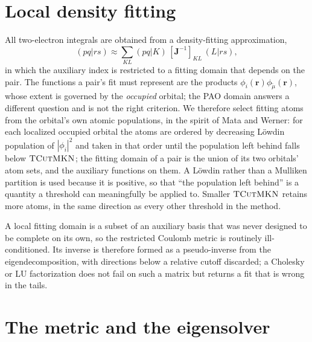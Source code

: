 \documentclass[aip,jcp,amsmath,amssymb,preprint,superscriptaddress]{revtex4-2}%
\newcommand{\pao}[1]{\tilde{#1}}
\newcommand{\TCut}[1]{\textsc{TCut#1}}
\begin{document}
\section{Local density fitting}
\label{sec:fitting}

All two-electron integrals are obtained from a density-fitting
approximation,\cite{Whitten1973,Vahtras1993}
%
\begin{equation}
  (pq|rs) \approx \sum_{KL} (pq|K)\,[\mathbf{J}^{-1}]_{KL}\,(L|rs),
\end{equation}
%
in which the auxiliary index is restricted to a fitting domain that depends
on the pair. The functions a pair's fit must represent are the products
$\phi_i(\mathbf{r})\phi_{\pao{\mu}}(\mathbf{r})$, whose extent is governed by
the \emph{occupied} orbital; the PAO domain answers a different question and is
not the right criterion. We therefore select fitting atoms from the orbital's
own atomic populations, in the spirit of Mata and
Werner:\cite{MataWerner2006} for each localized occupied orbital the atoms are
ordered by decreasing L\"owdin population of $|\phi_i|^2$ and taken in that
order until the population left behind falls below $\TCut{MKN}$; the fitting
domain of a pair is the union of its two orbitals' atom sets, and the
auxiliary functions on them. A L\"owdin rather than a Mulliken partition is
used because it is positive, so that ``the population left behind'' is a
quantity a threshold can meaningfully be applied to. Smaller $\TCut{MKN}$
retains more atoms, in the same direction as every other threshold in the
method.

A local fitting domain is a subset of an auxiliary basis that was never
designed to be complete on its own, so the restricted Coulomb metric is
routinely ill-conditioned. Its inverse is therefore formed as a pseudo-inverse
from the eigendecomposition, with directions below a relative cutoff
discarded; a Cholesky or LU factorization does not fail on such a matrix but
returns a fit that is wrong in the tails.

\section{The metric and the eigensolver}
\label{sec:solving}
\end{document}
